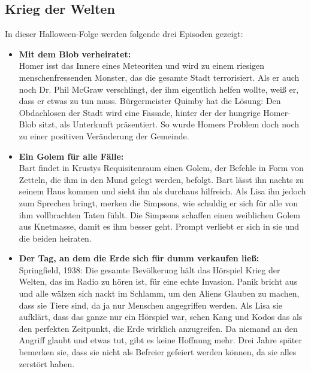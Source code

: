 \subsection{Krieg der Welten}\label{HABF17}
In dieser Halloween-Folge werden folgende drei Episoden gezeigt:
\begin{itemize}
	\item \textbf{Mit dem Blob verheiratet:}\\
	Homer isst das Innere eines Meteoriten und wird zu einem riesigen menschenfressenden Monster, das die gesamte Stadt terrorisiert. Als er auch noch Dr. Phil McGraw verschlingt, der ihm eigentlich helfen wollte, weiß er, dass er etwas zu tun muss. Bürgermeister Quimby hat die Lösung: Den Obdachlosen der Stadt wird eine Fassade, hinter der der hungrige Homer-Blob sitzt, als Unterkunft präsentiert. So wurde Homers Problem doch noch zu einer positiven Veränderung der Gemeinde.
	\item \textbf{Ein Golem für alle Fälle:}\\
	Bart findet in Krustys Requisitenraum einen Golem, der Befehle in Form von Zetteln, die ihm in den Mund gelegt werden, befolgt. Bart lässt ihn nachts zu seinem Haus kommen und sieht ihn als durchaus hilfreich. Als Lisa ihn jedoch zum Sprechen bringt, merken die Simpsons, wie schuldig er sich für alle von ihm vollbrachten Taten fühlt. Die Simpsons schaffen einen weiblichen Golem aus Knetmasse, damit es ihm besser geht. Prompt verliebt er sich in sie und die beiden heiraten.
	\item \textbf{Der Tag, an dem die Erde sich für dumm verkaufen ließ:}\\
	Springfield, 1938: Die gesamte Bevölkerung hält das Hörspiel \glqq Krieg der Welten\grqq , das im Radio zu hören ist, für eine echte Invasion. Panik bricht aus und alle wälzen sich nackt im Schlamm, um den Aliens Glauben zu machen, dass sie Tiere sind, da ja nur Menschen angegriffen werden. Als Lisa sie aufklärt, dass das ganze nur ein Hörspiel war, sehen Kang und Kodos das als den perfekten Zeitpunkt, die Erde wirklich anzugreifen. Da niemand an den Angriff glaubt und etwas tut, gibt es keine Hoffnung mehr. Drei Jahre später bemerken sie, dass sie nicht als Befreier gefeiert werden können, da sie alles zerstört haben. 
\end{itemize}

